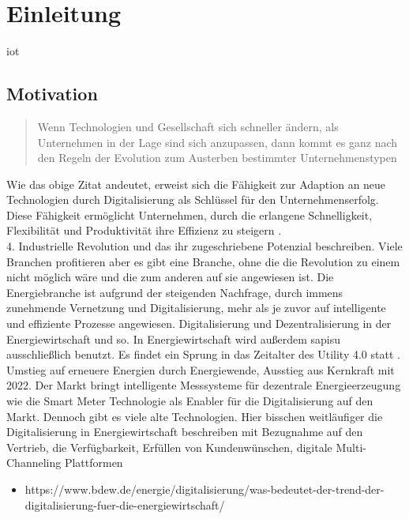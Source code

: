 \section{Einleitung}

\ac{iot}

\subsection{Motivation}

\begin{quotation}
  \glqq Wenn Technologien und Gesellschaft sich schneller ändern, als Unternehmen in der Lage sind sich anzupassen, dann kommt es ganz nach den Regeln der Evolution zum Austerben bestimmter Unternehmenstypen\grqq{} \citep[S. 3, zitiert nach Land, K.-H. 2015]{Roth2016}
\end{quotation}

Wie das obige Zitat andeutet, erweist sich die Fähigkeit zur Adaption an neue Technologien durch Digitalisierung als Schlüssel für den Unternehmenserfolg. Diese Fähigkeit ermöglicht Unternehmen, durch die erlangene Schnelligkeit, Flexibilität und Produktivität ihre Effizienz zu steigern \citep{Roth2016}.
\\4. Industrielle Revolution und das ihr zugeschriebene Potenzial beschreiben. Viele Branchen profitieren aber es gibt eine Branche,
ohne die die Revolution zu einem nicht möglich wäre und die zum anderen auf sie angewiesen ist.
Die Energiebranche ist aufgrund der steigenden Nachfrage, durch immens zunehmende Vernetzung und Digitalisierung, mehr als je zuvor auf intelligente und effiziente Prozesse angewiesen.
Digitalisierung und Dezentralisierung in der Energiewirtschaft und so. In Energiewirtschaft wird außerdem \ac{sapisu} ausschließlich benutzt.
Es findet ein Sprung in das Zeitalter des \glqq Utility 4.0\grqq{} statt \citep{Doleski2017}.
Umstieg auf erneuere Energien durch Energiewende, Ausstieg aus Kernkraft mit 2022. Der Markt bringt intelligente Messsysteme für dezentrale Energieerzeugung wie die Smart Meter Technologie als Enabler für
die Digitalisierung auf den Markt. Dennoch gibt es viele alte Technologien.
Hier bisschen weitläufiger die Digitalisierung in Energiewirtschaft beschreiben mit Bezugnahme auf den Vertrieb,
die Verfügbarkeit, Erfüllen von Kundenwünschen, digitale Multi-Channeling Plattformen

\begin{itemize}
  \item https://www.bdew.de/energie/digitalisierung/was-bedeutet-der-trend-der-digitalisierung-fuer-die-energiewirtschaft/
\end{itemize}

